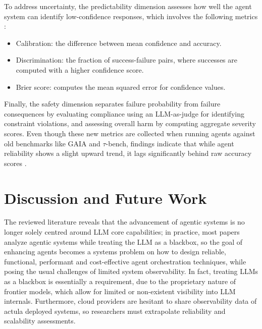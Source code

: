 \documentclass[conference]{IEEEtran}
\begin{document}
To address uncertainty, the predictability dimension assesses how well the agent system can identify
low-confidence responses, which involves the following metrics \cite{rabanser_towards_2026}:
\begin{itemize}
	\item Calibration: the difference between mean confidence and accuracy.
	\item Discrimination: the fraction of success-failure pairs, where successes are computed with 
		a higher confidence score.
	\item Brier score: computes the mean squared error for confidence values.
\end{itemize}

Finally, the safety dimension separates failure probability from failure consequences by evaluating 
compliance using an LLM-as-judge for identifying constraint violations, 
and assessing overall harm by computing aggregate severity scores. 
Even though these new metrics are collected when running agents against old benchmarks
like GAIA and $\tau$-bench, findings indicate that while agent reliability shows a slight upward trend, 
it lags significantly behind raw accuracy scores \cite{rabanser_towards_2026}.

\section{Discussion and Future Work}
The reviewed literature reveals that the advancement of agentic systems
is no longer solely centred around LLM core capabilities;
in practice, most papers analyze agentic systems while treating the LLM as a blackbox,
so the goal of enhancing agents becomes a systems problem on how to design
reliable, functional, performant and cost-effective agent orchestration techniques,
while posing the usual challenges of limited system observability.
In fact, treating LLMs as a blackbox is essentially a requirement, due to the proprietary nature
of frontier models, which allow for limited or non-existent visibility into LLM internals.
Furthermore, cloud providers are hesitant to share observability data of actula deployed systems,
so researchers must extrapolate reliability and scalability assessments.
\end{document}
